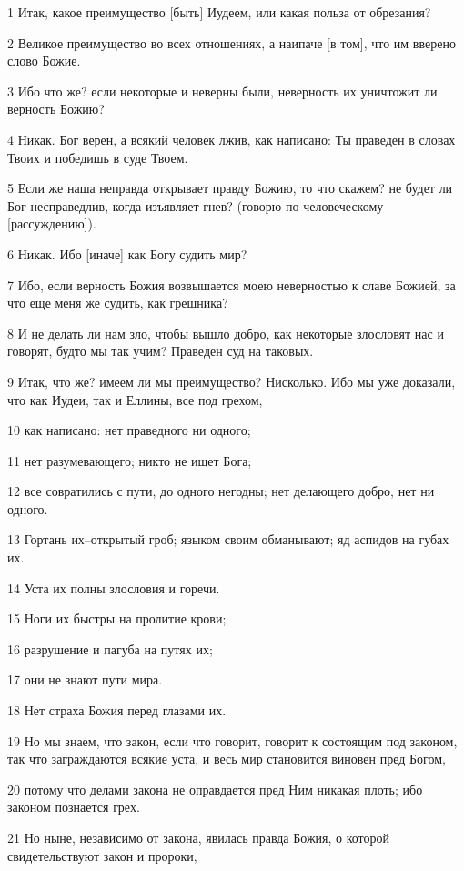 \par 1 Итак, какое преимущество [быть] Иудеем, или какая польза от обрезания?
\par 2 Великое преимущество во всех отношениях, а наипаче [в том], что им вверено слово Божие.
\par 3 Ибо что же? если некоторые и неверны были, неверность их уничтожит ли верность Божию?
\par 4 Никак. Бог верен, а всякий человек лжив, как написано: Ты праведен в словах Твоих и победишь в суде Твоем.
\par 5 Если же наша неправда открывает правду Божию, то что скажем? не будет ли Бог несправедлив, когда изъявляет гнев? (говорю по человеческому [рассуждению]).
\par 6 Никак. Ибо [иначе] как Богу судить мир?
\par 7 Ибо, если верность Божия возвышается моею неверностью к славе Божией, за что еще меня же судить, как грешника?
\par 8 И не делать ли нам зло, чтобы вышло добро, как некоторые злословят нас и говорят, будто мы так учим? Праведен суд на таковых.
\par 9 Итак, что же? имеем ли мы преимущество? Нисколько. Ибо мы уже доказали, что как Иудеи, так и Еллины, все под грехом,
\par 10 как написано: нет праведного ни одного;
\par 11 нет разумевающего; никто не ищет Бога;
\par 12 все совратились с пути, до одного негодны; нет делающего добро, нет ни одного.
\par 13 Гортань их--открытый гроб; языком своим обманывают; яд аспидов на губах их.
\par 14 Уста их полны злословия и горечи.
\par 15 Ноги их быстры на пролитие крови;
\par 16 разрушение и пагуба на путях их;
\par 17 они не знают пути мира.
\par 18 Нет страха Божия перед глазами их.
\par 19 Но мы знаем, что закон, если что говорит, говорит к состоящим под законом, так что заграждаются всякие уста, и весь мир становится виновен пред Богом,
\par 20 потому что делами закона не оправдается пред Ним никакая плоть; ибо законом познается грех.
\par 21 Но ныне, независимо от закона, явилась правда Божия, о которой свидетельствуют закон и пророки,
